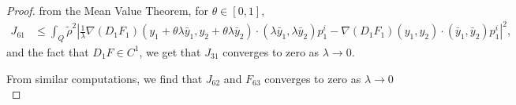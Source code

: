 \documentclass[11pt,a4paper]{amsart}
\numberwithin{equation}{section}
\begin{document}
\begin{proof}
    \noindent from the Mean Value Theorem, for $\theta \in [0,1]$,
    \begin{equation*}
        \begin{split}
            J_{61} &\leq \int_Q \tilde\rho^2 \left| \frac{1}{\lambda}
            \nabla (D_1 F_1) (y_1+ \theta\lambda \bar y_1,y_2+\theta\lambda \bar y_2)\cdot(\lambda \bar y_1,\lambda \bar y_2) p^i_1 - \nabla (D_1 F_1)(y_1,y_2)\cdot(\bar y_1,\bar y_2)p^i_1
            \right|^2,
        \end{split}
    \end{equation*}
    and the fact that $D_1 F \in C^1$, we get that $J_{31}$ converges to zero as $\lambda \to 0$. 
    
   \noindent  From similar computations, we find  that $J_{62}$ and $F_{63}$ converges to zero as $\lambda \to 0$
    

\end{proof}
\end{document}
